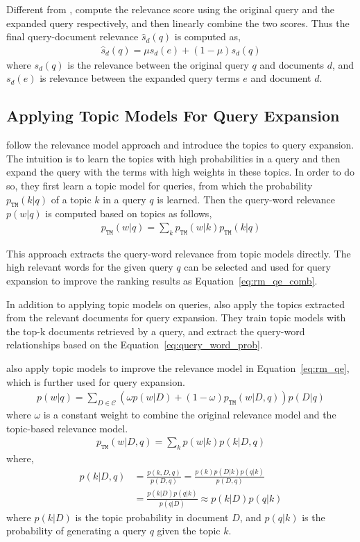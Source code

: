 Different from \cite{zhai-01b}, \cite{Lavrenko-2001} compute the relevance score using the original query and the expanded query respectively, and then linearly combine the two scores. Thus the final query-document relevance $\hat{s}_d(q)$ is computed as,
\begin{align}
\label{eq:rm_qe_comb}
\hat{s}_d(q) = \mu s_d(e) + (1-\mu)s_d(q)
\end{align}
where $s_d(q)$ is the relevance between the original query $q$ and documents $d$, and $s_d(e)$ is relevance between the expanded query terms $e$ and document $d$.

\subsection{Applying Topic Models For Query Expansion}

\cite{Yi-2009} follow the relevance model approach and introduce the topics to query expansion. The intuition is to learn the topics with high probabilities in a query and then expand the query with the terms with high weights in these topics. In order to do so, they first learn a topic model for queries, from which the probability $p_{\texttt{TM}}(k|q)$ of a topic $k$ in a query $q$ is learned. Then the query-word relevance $p(w|q)$ is computed based on topics as follows,
\begin{align}
\label{eq:query_word_prob}
p_{\texttt{TM}}(w|q) = \sum_k p_{\texttt{TM}}(w|k) p_{\texttt{TM}}(k|q)
\end{align}

This approach extracts the query-word relevance from topic models directly. The high relevant words for the given query $q$ can be selected and used for query expansion to improve the ranking results as Equation~\ref{eq:rm_qe_comb}.

In addition to applying topic models on queries, \cite{Yi-2009} also apply the topics extracted from the relevant documents for query expansion. They train topic models with the top-k documents retrieved by a query, and extract the query-word relationships based on the Equation~\ref{eq:query_word_prob}.

\cite{Yi-2009} also apply topic models to improve the relevance model in Equation~\ref{eq:rm_qe}, which is further used for query expansion.
\begin{align}
p(w|q) = \sum_{D \in \mathcal{C}} (\omega p(w|D) + (1 - \omega)p_{\texttt{TM}}(w|D,q))p(D|q)
\end{align}
where $\omega$ is a constant weight to combine the original relevance model and the topic-based relevance model.
\begin{align}
p_{\texttt{TM}}(w|D,q) = \sum_k p(w|k) p(k|D,q)
\end{align}
where,
\begin{align}
p(k|D,q) &= \frac{p(k,D,q)}{p(D,q)}  = \frac{p(k)p(D|k)p(q|k)}{p(D,q)} \\
&= \frac{p(k|D)p(q|k)}{p(q|D)} \approx p(k|D)p(q|k)
\end{align}
where $p(k|D)$ is the topic probability in document $D$, and $p(q|k)$ is the probability of generating a query $q$ given the topic $k$.

